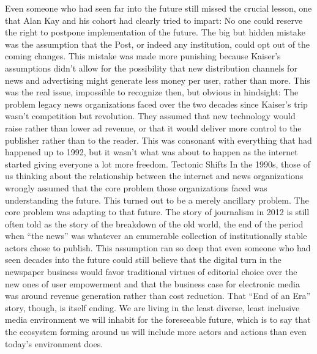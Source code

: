 Even someone who had seen far into the future still missed the crucial lesson,
one that Alan Kay and his cohort had clearly tried to impart: No one could
reserve the right to postpone implementation of the future. The big but hidden
mistake was the assumption that the Post, or indeed any institution, could opt out
of the coming changes. This mistake was made more punishing because Kaiser’s
assumptions didn’t allow for the possibility that new distribution channels for
news and advertising might generate less money per user, rather than more.
This was the real issue, impossible to recognize then, but obvious in hindsight:
The problem legacy news organizations faced over the two decades since Kaiser’s
trip wasn’t competition but revolution. They assumed that new technology
would raise rather than lower ad revenue, or that it would deliver more control to
the publisher rather than to the reader. This was consonant with everything that
had happened up to 1992, but it wasn’t what was about to happen as the internet
started giving everyone a lot more freedom.
Tectonic Shifts
In the 1990s, those of us thinking about the relationship between the internet
and news organizations wrongly assumed that the core problem those organizations
faced was understanding the future. This turned out to be a merely ancillary
problem. The core problem was adapting to that future.
The story of journalism in 2012 is still often told as the story of the breakdown of
the old world, the end of the period when ``the news'' was whatever an enumerable
collection of institutionally stable actors chose to publish. This assumption
ran so deep that even someone who had seen decades into the future could still
believe that the digital turn in the newspaper business would favor traditional
virtues of editorial choice over the new ones of user empowerment and that the
business case for electronic media was around revenue generation rather than
cost reduction.
That ``End of an Era'' story, though, is itself ending. We are living in the least
diverse, least inclusive media environment we will inhabit for the foreseeable
future, which is to say that the ecosystem forming around us will include more
actors and actions than even today’s environment does.

